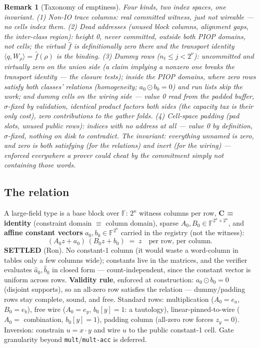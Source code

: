 \documentclass[11pt]{article}
\newcommand{\F}{\mathbb{F}}
\newcommand{\ip}[2]{\langle #1, #2 \rangle}
\newcommand{\code}[1]{\texttt{#1}}
\newcommand{\settled}[1]{\medskip\noindent\textbf{SETTLED} (#1).\xspace}
\newtheorem{remark}{Remark}
\theoremstyle{definition}
\begin{document}
\begin{remark}[Taxonomy of emptiness]\label{rem:empty}
Four kinds, two index spaces, one invariant. (1) \emph{Non-IO trace
columns}: real committed witness, just not wireable --- no cells index
them. (2) \emph{Dead addresses} (unused block columns, alignment gaps,
the inter-class region): height 0, never committed, outside both PIOP
domains, not cells; the virtual $\hat f$ is definitionally zero there
and the transport identity $\ip{q}{W_\rho} = \hat f(\rho)$ is the
binding. (3) \emph{Dummy rows} ($n_t \le j < 2^\nu$): uncommitted and
virtually zero on the union side (a claim implying a nonzero one breaks
the transport identity --- the closure tests); inside the PIOP domains,
where zero rows satisfy both classes' relations (homogeneity;
$a_0 \odot b_0 = 0$) and run lists skip the work; and dummy \emph{cells}
on the wiring side --- value 0 read from the padded buffer,
$\sigma$-fixed by validation, identical product factors both sides
(the capacity tax is their only cost), zero contributions to the gather
folds. (4) \emph{Cell-space padding} (pad slots, unused public rows):
indices with no address at all --- value 0 by definition, $\sigma$-fixed,
nothing on disk to contradict. The invariant: everything unnamed is
zero, and zero is both \emph{satisfying} (for the relations) and
\emph{inert} (for the wiring) --- enforced everywhere a prover could
cheat by the commitment simply not containing those words.
\end{remark}

\subsection{The relation}

A large-field type is a base block over $\F$: $2^\kappa$ witness columns
per row, \textbf{C = identity} (constraint domain $\equiv$ column domain),
sparse $A_0, B_0 \in \F^{2^\kappa \times 2^\kappa}$, and \textbf{affine
constant vectors} $a_0, b_0 \in \F^{2^\kappa}$ carried in the registry
(not the witness):
\[
  (A_0 z + a_0)\,(B_0 z + b_0) \;=\; z
  \quad\text{per row, per column.}
\]
\settled{Ron} No constant-1 column (it would waste a word-column in
tables only a few columns wide); constants live in the matrices, and the
verifier evaluates $\hat a_0, \hat b_0$ in closed form ---
count-independent, since the constant vector is uniform across rows.
\textbf{Validity rule}, enforced at construction: $a_0 \odot b_0 = 0$
(disjoint supports), so an all-zero row satisfies the relation ---
dummy/padding rows stay complete, sound, and free. Standard rows:
multiplication ($A_0 = e_a$, $B_0 = e_b$), free wire ($A_0 = e_y$,
$b_0[y] = 1$: a tautology), linear-pinned-to-wire ($A_0 =$ combination,
$b_0[y] = 1$), padding column (all-zero row forces $z_y = 0$). Inversion:
constrain $u = x \cdot y$ and wire $u$ to the public constant-1 cell.
Gate granularity beyond \code{mult}/\code{mult-acc} is deferred.
\end{document}
